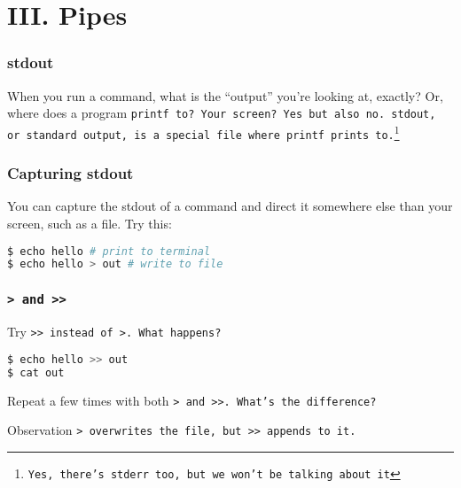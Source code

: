 \section{III. Pipes}
\begin{frame}
\frametitle{stdout}
When you run a command, what is the ``output'' you're looking at, exactly?
Or, where does a program \tt{printf} to?
\newline \newline
Your screen? Yes but also no.
\newline \newline
\tt{stdout}, or standard output, is a special file where \tt{printf}
prints to.\footnote{Yes, there's \tt{stderr} too, but we won't be talking
about it}
\end{frame}

\begin{frame}[fragile]
\frametitle{Capturing stdout}
You can capture the stdout of a command and direct it somewhere else than your
screen, such as a file.
Try this:
\begin{lstlisting}[language=bash]
$ echo hello # print to terminal
$ echo hello > out # write to file
\end{lstlisting}
\begin{figure}
    \centering
\end{figure}
\end{frame}

\begin{frame}[fragile]
\frametitle{\tt{>} and \tt{>>}}
Try \tt{>>} instead of \tt{>}. What happens?
\begin{lstlisting}[language=bash]
$ echo hello >> out
$ cat out
\end{lstlisting}
Repeat a few times with both \tt{>} and \tt{>>}. What's the difference?
\pause
\begin{block}{Observation}
    \tt{>} overwrites the file, but \tt{>>} appends to it.
\end{block}
\end{frame}

